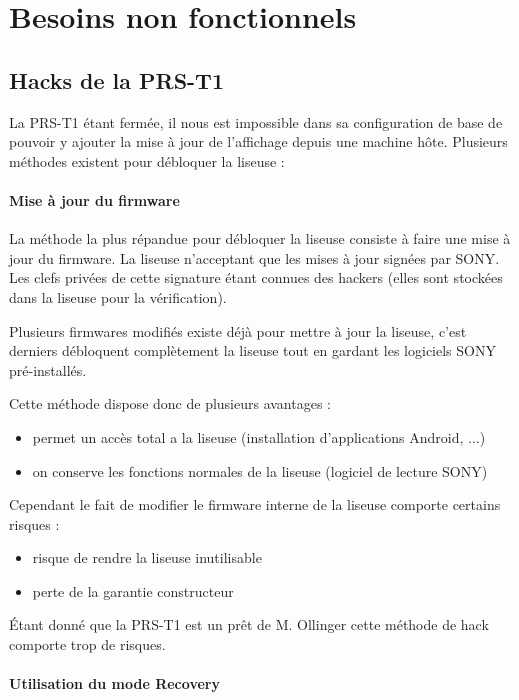 \chapter{Besoins non fonctionnels}
\section{Hacks de la PRS-T1}

La PRS-T1 étant fermée, il nous est impossible dans sa configuration de base de pouvoir y ajouter la mise à jour 
de l'affichage depuis une machine hôte.
Plusieurs méthodes existent pour débloquer la liseuse : 

\subsubsection{Mise à jour du firmware}

La méthode la plus répandue pour débloquer la liseuse consiste à faire une mise à jour du firmware.
La liseuse n'acceptant que les mises à jour signées par SONY. Les clefs privées de cette signature étant connues des hackers (elles sont stockées dans la liseuse pour la vérification).

Plusieurs firmwares modifiés existe déjà pour mettre à jour la liseuse, c'est derniers débloquent complètement la liseuse tout en gardant les logiciels SONY pré-installés.

Cette méthode dispose donc de plusieurs avantages : 
	\begin{itemize}
		\item permet un accès total a la liseuse (installation d'applications Android, ...)
		\item on conserve les fonctions normales de la liseuse (logiciel de lecture SONY)
	\end{itemize}
Cependant le fait de modifier le firmware interne de la liseuse comporte certains risques : 
	\begin{itemize}
		\item risque de rendre la liseuse inutilisable
		\item perte de la garantie constructeur
	\end{itemize}

Étant donné que la PRS-T1 est un prêt de M. Ollinger cette méthode de hack comporte trop de risques.

\subsubsection{Utilisation du mode Recovery}


